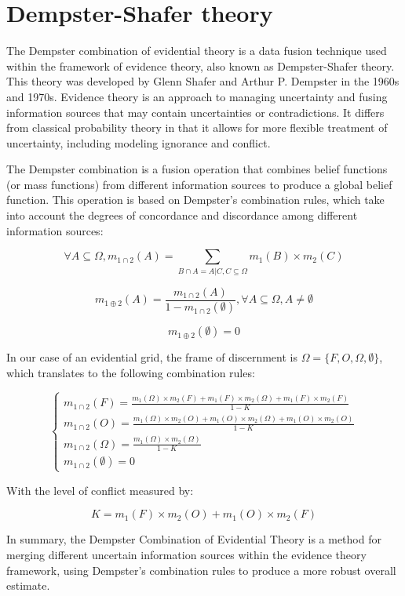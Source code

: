 \section{Dempster-Shafer theory} \label{sec:dempster_shafer_theory}

The Dempster combination of evidential theory is a data fusion technique used within the framework of evidence theory, also known as Dempster-Shafer theory.
This theory was developed by Glenn Shafer and Arthur P. Dempster in the 1960s and 1970s.
Evidence theory is an approach to managing uncertainty and fusing information sources that may contain uncertainties or contradictions.
It differs from classical probability theory in that it allows for more flexible treatment of uncertainty, including modeling ignorance and conflict.

The Dempster combination is a fusion operation that combines belief functions (or mass functions) from different information sources to produce a global belief function.
This operation is based on Dempster's combination rules, which take into account the degrees of concordance and discordance among different information sources:

$$
    \forall A \subseteq \Omega, m_{1\cap2}(A) = \sum_{B\cap A = A | C, C \subseteq \Omega} m_{1}(B) \times m_{2}(C)
$$

$$
    m_{1\oplus2}(A) = \frac{m_{1\cap2}(A)}{1-m_{1\cap2}(\emptyset)}, \forall A\subseteq \Omega, A \neq \emptyset
$$

$$
    m_{1 \oplus 2}(\emptyset) = 0
$$

In our case of an evidential grid, the frame of discernment is $\Omega = \{F, O, \Omega, \emptyset\}$, which translates to the following combination rules:

$$
    \begin{cases}
        m_{1\cap2}(F) = \frac{m_{1}(\Omega) \times m_{2}(F) + m_{1}(F) \times m_{2}(\Omega) + m_{1}(F) \times m_{2}(F)}{1 - K} \\
        m_{1\cap2}(O) = \frac{m_{1}(\Omega) \times m_{2}(O) + m_{1}(O) \times m_{2}(\Omega) + m_{1}(O) \times m_{2}(O)}{1 - K} \\
        m_{1\cap2}(\Omega) = \frac{m_{1}(\Omega) \times m_{2}(\Omega)}{1 - K}                                                  \\
        m_{1\cap2}(\emptyset) = 0
    \end{cases}
$$

With the level of conflict measured by:

$$
    K = m_{1}(F) \times m_{2}(O) + m_{1}(O) \times m_{2}(F)
$$

In summary, the Dempster Combination of Evidential Theory is a method for merging different uncertain information sources within the evidence theory framework, using Dempster's combination rules to produce a more robust overall estimate.

